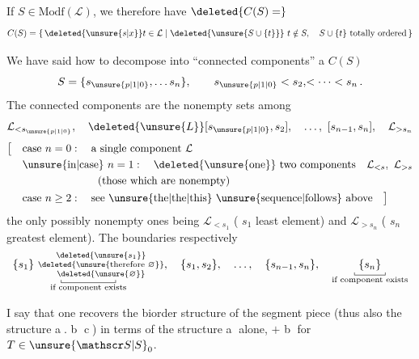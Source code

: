 If $S\in\mathrm{Modf}(\mathcal L)$, we therefore have $\deleted{C(S)=}$
\[
C(S)=\{\,\deleted{\unsure{s|x}}t\in\mathcal L\mid\deleted{\unsure{S\cup\{t\}}}\ t\notin S,\quad S\cup\{t\}\ \text{totally ordered}\,\}
\]

We have said how to decompose into ``connected components'' a $C(S)$ 
\[
 S=\{s_{\unsure{p|1|0}},\ldots s_n\},\qquad s_{\unsure{p|1|0}}<s_2,\!<\cdots<s_n\,.
\]
The connected components are the nonempty sets among
\[
\mathcal L_{<s_{\unsure{p|1|0}}},\quad \deleted{\unsure{L}}[s_{\unsure{p|1|0}},s_2],\quad\ldots,\ [s_{n-1},s_n],\quad \mathcal L_{>s_n}
\]
\[
\begin{aligned}
\bigl[\quad&\text{case }n=0:\quad\text{a single component }\mathcal L\\
&\text{\unsure{in|case} }n=1:\quad\deleted{\text{\unsure{one}}}\ \text{two components}\quad \mathcal L_{<s},\ \mathcal L_{>s}\\
&\hspace{7em}\text{(those which are nonempty)}\\
&\text{case }n\geq2:\quad\text{see \unsure{the|the|this} \unsure{sequence|follows} above}\quad\bigr]
\end{aligned}
\]
the only possibly nonempty ones being $\mathcal L_{<s_1}$ ( $s_1$ least element) and $\mathcal L_{>s_n}$ ( $s_n$ greatest element). The boundaries  respectively
\[
\underset{\substack{\rule{.4pt}{.6ex}\rule{4.8em}{.4pt}\rule{.4pt}{.6ex}\\\text{if component exists}}}{\{s_1\}\ \substack{\deleted{\unsure{s_1}}\\\deleted{\unsure{\text{therefore }\varnothing}}\\\deleted{\unsure{\varnothing}}}},
\quad\{s_1,s_2\},\quad\ldots,\quad\{s_{n-1},s_n\},\quad
\underset{\substack{\rule{.4pt}{.6ex}\rule{2.7em}{.4pt}\rule{.4pt}{.6ex}\\\text{if component exists}}}{\{s_n\}}
\]

I say that one recovers the  biorder structure of the segment piece (thus also the structure \textcircled{a}. \textcircled{b} \textcircled{c}) in terms of the structure \textcircled{a} alone, $+$ \textcircled{b} for $T\in\unsure{\mathscr S|S}_0$.

